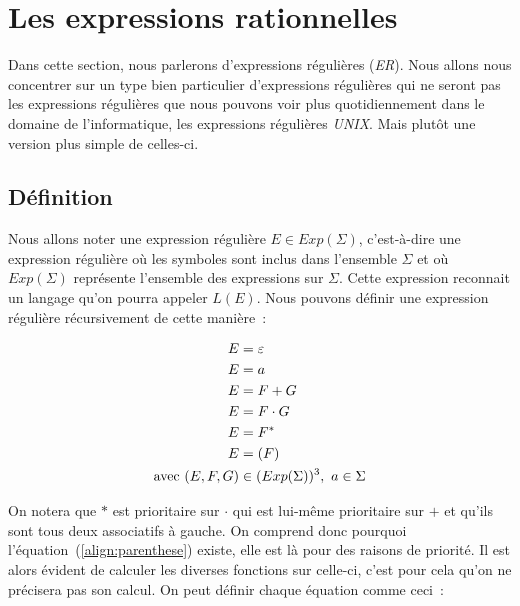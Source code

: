 \section{Les expressions rationnelles}

Dans cette section, nous parlerons d'expressions régulières (\textit{ER}). Nous
allons nous concentrer sur un type bien particulier d'expressions régulières
qui ne seront pas les expressions régulières que nous pouvons voir plus
quotidiennement dans le domaine de l'informatique, les expressions régulières
\textit{UNIX}. Mais plut\^{o}t une version plus simple de celles-ci.

\subsection{Définition}

Nous allons noter une expression régulière \(E \in Exp(\Sigma)\), c'est-à-dire
une expression régulière où les symboles sont inclus dans l'ensemble \(\Sigma\)
et où \(Exp(\Sigma)\) représente l'ensemble des expressions sur \(\Sigma\).
Cette expression reconnait un langage qu'on pourra appeler \(L(E)\). Nous
pouvons définir une expression régulière récursivement de cette manière~:

\begin{align}
    E & = \varepsilon                             \\
    E & = a                                       \\
    E & = F + G                                   \\
    E & = F \cdot G                               \\
    E & = F^*                                     \\
    E & = (F)\label{align:parenthese}             \\
    \text{avec } (E, F, G) & \in (Exp(\Sigma))^3,~ a \in \Sigma \notag
\end{align}

On notera que \(*\) est prioritaire sur \(\cdot\) qui est lui-même prioritaire
sur \(+\) et qu'ils sont tous deux associatifs à gauche. On comprend donc
pourquoi l'équation~(\ref{align:parenthese}) existe, elle est là pour des
raisons de priorité. Il est alors évident de calculer les diverses fonctions
sur celle-ci, c'est pour cela qu'on ne précisera pas son
calcul\label{subsec:parenthese}. On peut définir chaque équation comme ceci~:

\vphantom{}

